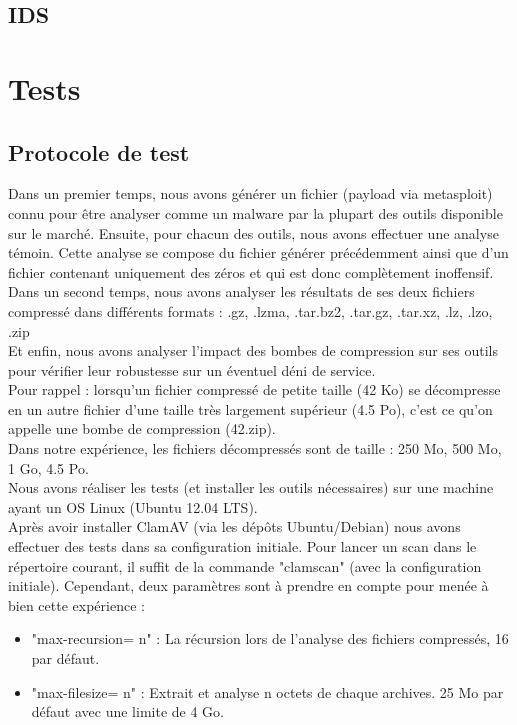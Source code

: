 \documentclass[smallextended]{svjour3}       %
\begin{document}
\subsection{IDS}
\label{2.3ids}


\section{Tests}
\label{3.Tests}

\subsection{Protocole de test}
\label{3.1Protocole}
Dans un premier temps, nous avons générer un fichier (payload via metasploit) connu pour être analyser comme un malware par la plupart des outils disponible sur le marché. Ensuite, pour chacun des outils, nous avons effectuer une analyse témoin. Cette analyse se compose du fichier générer précédemment ainsi que d'un fichier contenant uniquement des zéros et qui est donc complètement inoffensif.\\
Dans un second temps, nous avons analyser les résultats de ses deux fichiers compressé dans différents formats : .gz, .lzma, .tar.bz2, .tar.gz, .tar.xz, .lz, .lzo, .zip\\
Et enfin, nous avons analyser l'impact des bombes de compression sur ses outils pour vérifier leur robustesse sur un éventuel déni de service.\\
Pour rappel : lorsqu'un fichier compressé de petite taille (42 Ko) se décompresse en un autre fichier d'une taille très largement supérieur (4.5 Po), c'est ce qu'on appelle une bombe de compression (42.zip).\\
Dans notre expérience, les fichiers décompressés sont de taille : 250 Mo, 500 Mo, 1 Go, 4.5 Po.
$ $\\
Nous avons réaliser les tests (et installer les outils nécessaires) sur une machine ayant un OS Linux (Ubuntu 12.04 LTS).\\
Après avoir installer ClamAV (via les dépôts Ubuntu/Debian) nous avons effectuer des tests dans sa configuration initiale. Pour lancer un scan dans le répertoire courant, il suffit de la commande "clamscan" (avec la configuration initiale). Cependant, deux paramètres sont à prendre en compte pour menée à bien cette expérience :
\begin{itemize}
\item "max-recursion= n" : La récursion lors de l'analyse des fichiers compressés, 16 par défaut.
\item "max-filesize= n" : Extrait et analyse  n octets de chaque archives. 25 Mo par défaut avec une limite de 4 Go.
\end{itemize}
\end{document}

